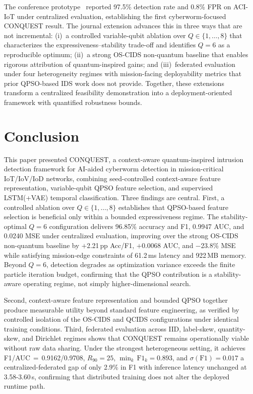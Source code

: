 \documentclass[conference]{IEEEtran}
\begin{document}
The conference prototype~\cite{ajakweconquest} reported
97.5\% detection rate and 0.8\% FPR on ACI-IoT under
centralized evaluation, establishing the first
cyberworm-focused CONQUEST result. The journal extension
advances this in three ways that are not incremental: (i)~a
controlled variable-qubit ablation over $Q\in\{1,\dots,8\}$
that characterizes the expressiveness--stability trade-off
and identifies $Q{=}6$ as a reproducible optimum; (ii)~a
strong OS-CIDS non-quantum baseline that enables rigorous
attribution of quantum-inspired gains; and (iii)~federated
evaluation under four heterogeneity regimes with
mission-facing deployability metrics that prior
QPSO-based IDS work does not provide. Together, these
extensions transform a centralized feasibility demonstration
into a deployment-oriented framework with quantified
robustness bounds.





\section{Conclusion}
\label{sec:conclusion}

This paper presented CONQUEST, a context-aware
quantum-inspired intrusion detection framework for AI-aided
cyberworm detection in mission-critical IoT/IoV/IoD networks,
combining seed-controlled context-aware feature representation,
variable-qubit QPSO feature selection, and supervised
LSTM(+VAE) temporal classification.
Three findings are central. First, a controlled ablation over
$Q\in\{1,\dots,8\}$ establishes that QPSO-based feature
selection is beneficial only within a bounded expressiveness
regime. The stability-optimal $Q{=}6$ configuration delivers
96.85\% accuracy and F1, 0.9947 AUC, and 0.0240 MSE under
centralized evaluation, improving over the strong OS-CIDS
non-quantum baseline by $+$2.21\,pp Acc/F1, $+$0.0068 AUC,
and $-$23.8\% MSE while satisfying mission-edge constraints
of 61.2\,ms latency and 922\,MB memory. Beyond $Q{=}6$,
detection degrades as optimization variance exceeds the
finite particle iteration budget, confirming that the
QPSO contribution is a stability-aware operating regime,
not simply higher-dimensional search.

Second, context-aware feature representation and bounded
QPSO together produce measurable utility beyond standard
feature engineering, as verified by controlled isolation
of the OS-CIDS and QCIDS configurations under identical
training conditions.
Third, federated evaluation across IID, label-skew,
quantity-skew, and Dirichlet regimes shows that CONQUEST
remains operationally viable without raw data sharing.
Under the strongest heterogeneous setting, it achieves
F1/AUC\,$=$\,0.9162/0.9708, $R_{90}{=}25$,
$\min_k\,\mathrm{F1}_k{=}0.893$, and
$\sigma(\mathrm{F1}){=}0.017$ a centralized-federated
gap of only 2.9\% in F1 with inference latency unchanged
at 3.58-3.60\,s, confirming that distributed training
does not alter the deployed runtime path.
\end{document}
